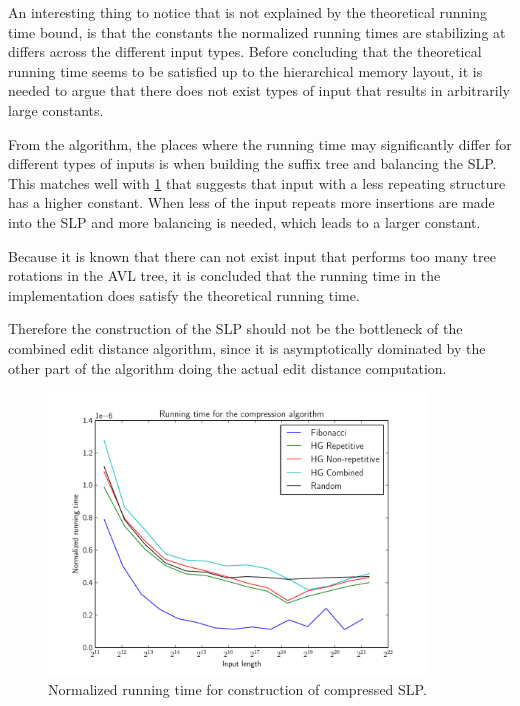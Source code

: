 \documentclass[twoside,11pt,openright]{report}
\begin{document}
An interesting thing to notice that is not explained by the theoretical running time bound, is that the constants the normalized running times are stabilizing at differs across the different input types. Before concluding that the theoretical running time seems to be satisfied up to the hierarchical memory layout, it is needed to argue that there does not exist types of input that results in arbitrarily large constants.

From the algorithm, the places where the running time may significantly differ for different types of inputs is when building the suffix tree and balancing the SLP. This matches well with \cref{fig:compression:runningtime} that suggests that input with a less repeating structure has a higher constant. When less of the input repeats more insertions are made into the SLP and more balancing is needed, which leads to a larger constant.

Because it is known that there can not exist input that performs too many tree rotations in the AVL tree, it is concluded that the running time in the implementation does satisfy the theoretical running time.

Therefore the construction of the SLP should not be the bottleneck of the combined edit distance algorithm, since it is asymptotically dominated by the other part of the algorithm doing the actual edit distance computation.
%
\begin{figure}[!htb]
  \centering
  \includegraphics[width=10cm]{compression/runningtime}
  \caption{Normalized running time for construction of compressed SLP.}
  \label{fig:compression:runningtime}
\end{figure}
\end{document}
